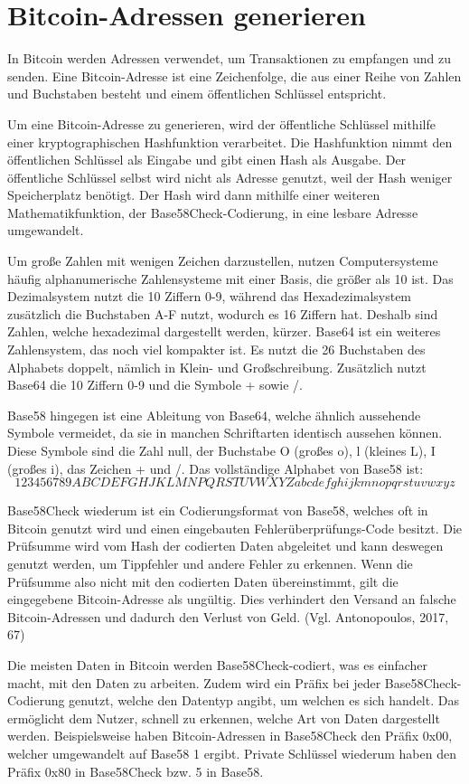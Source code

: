 \section{Bitcoin-Adressen generieren}
In Bitcoin werden Adressen verwendet, um Transaktionen zu empfangen und zu senden. Eine Bitcoin-Adresse ist eine Zeichenfolge, 
die aus einer Reihe von Zahlen und Buchstaben besteht und einem öffentlichen Schlüssel entspricht.

Um eine Bitcoin-Adresse zu generieren, wird der öffentliche Schlüssel mithilfe einer kryptographischen Hashfunktion verarbeitet.
Die Hashfunktion nimmt den öffentlichen Schlüssel als Eingabe und gibt einen Hash als Ausgabe. Der öffentliche Schlüssel selbst
wird nicht als Adresse genutzt, weil der Hash weniger Speicherplatz benötigt. Der Hash wird dann mithilfe einer weiteren 
Mathematikfunktion, der Base58Check-Codierung, in eine lesbare Adresse umgewandelt.

Um große Zahlen mit wenigen Zeichen darzustellen, nutzen Computersysteme häufig alphanumerische Zahlensysteme mit einer Basis,
die größer als 10 ist. Das Dezimalsystem nutzt die 10 Ziffern 0-9, während das Hexadezimalsystem zusätzlich die Buchstaben A-F
nutzt, wodurch es 16 Ziffern hat. Deshalb sind Zahlen, welche hexadezimal dargestellt werden, kürzer. Base64 ist ein weiteres
Zahlensystem, das noch viel kompakter ist. Es nutzt die 26 Buchstaben des Alphabets doppelt, nämlich in Klein- und Großschreibung.
Zusätzlich nutzt Base64 die 10 Ziffern 0-9 und die Symbole + sowie /.

Base58 hingegen ist eine Ableitung von Base64, welche ähnlich aussehende Symbole vermeidet, da sie in manchen Schriftarten
identisch aussehen können. Diese Symbole sind die Zahl null, der Buchstabe O (großes o), l (kleines L), I (großes i), das 
Zeichen + und /. Das vollständige Alphabet von Base58 ist: \[123456789ABCDEFGHJKLMNPQRSTUVWXYZabcdefghijkmnopqrstuvwxyz\]

Base58Check wiederum ist ein Codierungsformat von Base58, welches oft in Bitcoin genutzt wird und einen eingebauten
Fehlerüberprüfungs-Code besitzt. Die Prüfsumme wird vom Hash der codierten Daten abgeleitet und kann deswegen genutzt werden, 
um Tippfehler und andere Fehler zu erkennen. Wenn die Prüfsumme also nicht mit den codierten Daten übereinstimmt, gilt die
eingegebene Bitcoin-Adresse als ungültig. Dies verhindert den Versand an falsche Bitcoin-Adressen und dadurch den Verlust
von Geld. (Vgl. Antonopoulos, 2017, 67)

Die meisten Daten in Bitcoin werden Base58Check-codiert, was es einfacher macht, mit den Daten zu arbeiten. Zudem wird ein Präfix
bei jeder Base58Check-Codierung genutzt, welche den Datentyp angibt, um welchen es sich handelt. Das ermöglicht dem Nutzer, schnell
zu erkennen, welche Art von Daten dargestellt werden. Beispielsweise haben Bitcoin-Adressen in Base58Check den Präfix 0x00, welcher
umgewandelt auf Base58 1 ergibt. Private Schlüssel wiederum haben den Präfix 0x80 in Base58Check bzw. 5 in Base58.

